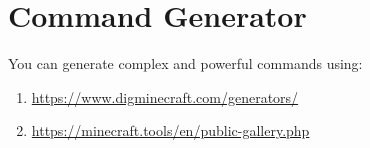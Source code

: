 \clearpage
\section{Command Generator}
You can generate complex and powerful commands using:
\begin{enumerate}
    \item \url{https://www.digminecraft.com/generators/}
    \item \url{https://minecraft.tools/en/public-gallery.php}
\end{enumerate}



